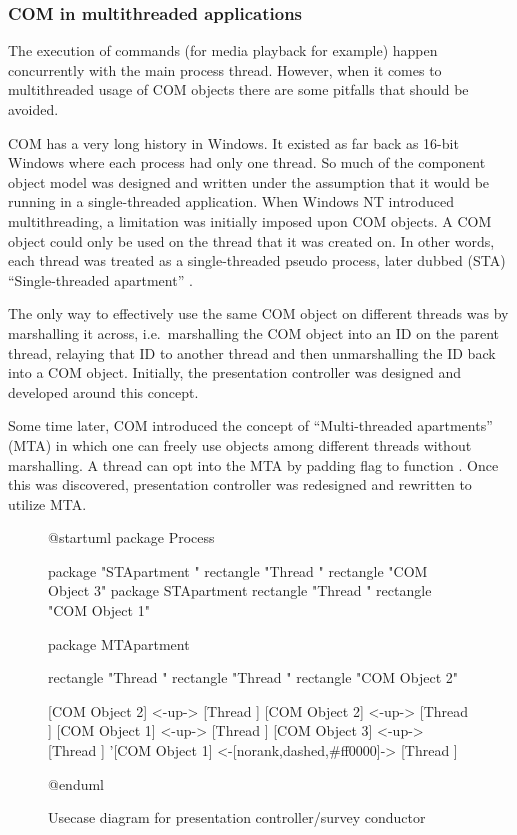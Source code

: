 \documentclass[12pt, fleqn, a4paper]{article}
\begin{document}
\subsubsection{COM in multithreaded applications}
The execution of commands (for media playback for example) happen concurrently with the main process thread. However, when it comes to multithreaded usage of COM objects there are some pitfalls that should be avoided.\par
COM has a very long history in Windows. It existed as far back as 16-bit Windows where each process had only one thread. So much of the component object model was designed and written under the assumption that it would be running in a single-threaded application. When Windows NT introduced multithreading, a limitation was initially imposed upon COM objects. A COM object could only be used on the thread that it was created on. In other words, each thread was treated as a single-threaded pseudo process, later dubbed (STA) \enquote{Single-threaded apartment} \citep{chen_2019}.\par
The only way to effectively use the same COM object on different threads was by marshalling it across, i.e.\ marshalling the COM object into an ID on the parent thread, relaying that ID to another thread and then unmarshalling the ID back into a COM object. Initially, the presentation controller was designed and developed around this concept.\par
Some time later, COM introduced the concept of \enquote{Multi-threaded apartments} (MTA) in which one can freely use objects among different threads without marshalling. A thread can opt into the MTA by padding  flag to function  \citep{pywin32}. Once this was discovered, presentation controller was redesigned and rewritten to utilize MTA.
\begin{figure}[H]
	\centering
	\begin{plantuml}
@startuml
package Process {
  package "STApartment " {
    rectangle "Thread    " 
    rectangle "COM Object 3"
  }
  package STApartment {
    rectangle "Thread " 
    rectangle "COM Object 1"
  }

  package MTApartment {
    rectangle "Thread  "
    rectangle "Thread   "
    rectangle "COM Object 2" 
    
  }
}
[COM Object 2] <-up-> [Thread  ]
[COM Object 2] <-up-> [Thread   ]
[COM Object 1] <-up-> [Thread ]
[COM Object 3] <-up-> [Thread    ]
'[COM Object 1] <-[norank,dashed,#ff0000]-> [Thread    ]

@enduml
	\end{plantuml}
	\caption{Usecase diagram for presentation controller/survey conductor}
\end{figure}
\end{document}
